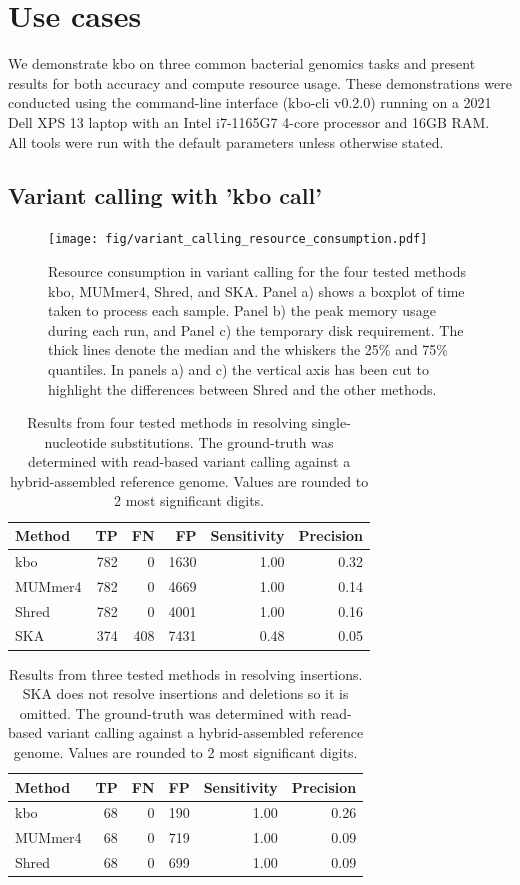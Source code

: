 \documentclass[unnumsec,webpdf,modern,large]{biorxiv}%
\theoremstyle{thmstyleone}%
\theoremstyle{thmstyletwo}%
\theoremstyle{thmstylethree}%
\newcommand{\kbo}{{\sf kbo}}
\begin{document}
\section{Use cases}
We demonstrate {\sf kbo} on three common bacterial genomics tasks and present results for both accuracy and compute resource usage. These demonstrations were conducted using the command-line interface (kbo-cli v0.2.0) running on a 2021 Dell XPS 13 laptop with an Intel i7-1165G7 4-core processor and 16GB RAM. All tools were run with the default parameters unless otherwise stated.

\subsection{Variant calling with 'kbo call'}
\begin{figure}
    \centering
    \texttt{[image: fig/variant\_calling\_resource\_consumption.pdf]}
    \caption{Resource consumption in variant calling for the four tested methods \kbo, MUMmer4, Shred, and SKA. Panel a) shows a boxplot of time taken to process each sample. Panel b) the peak memory usage during each run, and Panel c) the temporary disk requirement. The thick lines denote the median and the whiskers the 25\% and 75\% quantiles. In panels a) and c) the vertical axis has been cut to highlight the differences between Shred and the other methods. }
    \label{fig:vc-resource-usage}
\end{figure}

\begin{table}[]
\centering
\begin{tabular}{lrrrrr}
Method & TP  & FN  & FP   & Sensitivity & Precision \\
\hline
\kbo    & 782 & 0   & 1630 & 1.00    & 0.32  \\
MUMmer4 & 782 & 0   & 4669 & 1.00    & 0.14  \\
Shred  & 782 & 0   & 4001 & 1.00    & 0.16  \\
SKA    & 374 & 408 & 7431 & 0.48    & 0.05
\end{tabular}
\caption{Results from four tested methods in resolving single-nucleotide substitutions. The ground-truth was determined with read-based variant calling against a hybrid-assembled reference genome. Values are rounded to 2 most significant digits.}
\label{vc-snps}
\end{table}
\begin{table}[]
\centering
\begin{tabular}{lrrrrr}
Method & TP & FN & FP  & Sensitivity & Precision \\
\hline
\kbo    & 68 & 0  & 190 & 1.00    & 0.26  \\
MUMmer4 & 68 & 0  & 719 & 1.00    & 0.09  \\
Shred  & 68 & 0  & 699 & 1.00    & 0.09  
\end{tabular}
\caption{Results from three tested methods in resolving insertions. SKA does not resolve insertions and deletions so it is omitted. The ground-truth was determined with read-based variant calling against a hybrid-assembled reference genome. Values are rounded to 2 most significant digits.}
\label{vc-indels}
\end{table}
\end{document}
